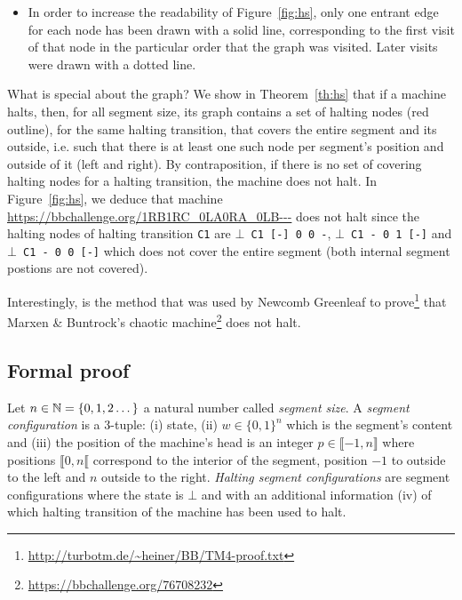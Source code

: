 \begin{itemize}
  \item In order to increase the readability of Figure~\ref{fig:hs}, only one entrant edge for each node has been drawn with a solid line, corresponding to the first visit of that node in the particular order that the graph was visited. Later visits were drawn with a dotted line.
\end{itemize}

What is special about the \HS graph? We show in Theorem~\ref{th:hs} that if a machine halts, then, for all segment size, its \HS graph contains a set of halting nodes (red outline), for the same halting transition, that covers the entire segment and its outside, i.e. such that there is at least one such node per segment's position and outside of it (left and right). By contraposition, if there is no set of covering halting nodes for a halting transition, the machine does not halt. In Figure~\ref{fig:hs}, we deduce that machine \url{https://bbchallenge.org/1RB1RC_0LA0RA_0LB---} does not halt since the halting nodes of halting transition \texttt{C1} are \texttt{$\bot$ C1 [-] 0 0 -}, \texttt{$\bot$ C1 - 0 1 [-]} and \texttt{$\bot$ C1 - 0 0 [-]} which does not cover the entire segment (both internal segment postions are not covered).

Interestingly, \HS is the method that was used by Newcomb Greenleaf to prove\footnote{\url{http://turbotm.de/~heiner/BB/TM4-proof.txt}} that Marxen \& Buntrock's chaotic machine\footnote{\url{https://bbchallenge.org/76708232}} \cite{Marxen_1998} does not halt.

\subsection{Formal proof}

\begin{definition}\label{def:hs-conf}\normalfont
  Let $n \in \mathbb{N} = \{0, 1, 2 \dots\}$ a natural number called \textit{segment size}. A \textit{segment configuration} is a 3-tuple: (i) state, (ii) $w \in \{0,1\}^n$ which is the segment's content and (iii) the position of the machine's head is an integer $p \in \llbracket -1, n \rrbracket$ where positions $\llbracket 0,n \llbracket$ correspond to the interior of the segment, position $-1$ to outside to the left and $n$ outside to the right. \textit{Halting segment configurations} are segment configurations where the state is $\bot$ and with an additional information (iv) of which halting transition of the machine has been used to halt.
\end{definition}

